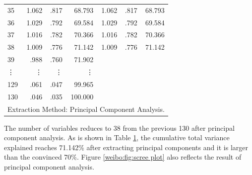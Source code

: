 \documentclass[review,3p,times,12pt,number]{elsarticle}
\begin{document}
\begin{table}[htbp]
\begin{tabular}{rrrrrrr}
    \multicolumn{1}{l}{35} & 1.062 & .817  & 68.793 & 1.062 & .817  & 68.793 \\
    \multicolumn{1}{l}{36} & 1.029 & .792  & 69.584 & 1.029 & .792  & 69.584 \\
    \multicolumn{1}{l}{37} & 1.016 & .782  & 70.366 & 1.016 & .782  & 70.366 \\
    \multicolumn{1}{l}{38} & 1.009 & .776  & 71.142 & 1.009 & .776  & 71.142 \\
    \multicolumn{1}{l}{39} & .988  & .760  & 71.902 & \multicolumn{1}{l}{} & \multicolumn{1}{l}{} & \multicolumn{1}{l}{} \\
    \multicolumn{1}{l}{\vdots} & \vdots     & \vdots     & \vdots     & \multicolumn{1}{l}{} & \multicolumn{1}{l}{} & \multicolumn{1}{l}{} \\
    \multicolumn{1}{l}{129} & .061  & .047  & 99.965 & \multicolumn{1}{l}{} & \multicolumn{1}{l}{} & \multicolumn{1}{l}{} \\
    \multicolumn{1}{l}{130} & .046  & .035  & 100.000 & \multicolumn{1}{l}{} & \multicolumn{1}{l}{} & \multicolumn{1}{l}{} \\
    \multicolumn{7}{l}{Extraction Method: Principal Component Analysis.} \\
    \bottomrule
    \end{tabular}%
  \label{tab:Variance Explained}%
\end{table}%

The number of variables reduces to 38 from the previous 130 after principal component analysis.
As is shown in Table \ref{tab:Variance Explained}, the cumulative total variance explained reaches 71.142\% after extracting principal components and it is larger than the convinced 70\%.
Figure \ref{weibo:fig:scree plot} also reflects the result of principal component analysis.
\end{document}
